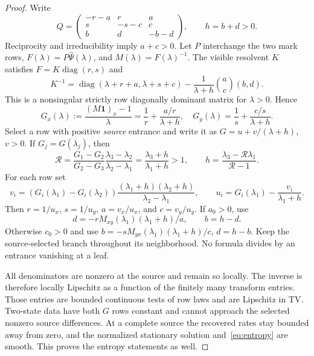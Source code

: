 \documentclass[aps,pre,onecolumn,11pt,longbibliography,notitlepage]{revtex4-2}
\newcommand{\1}{\mathbf 1}
\newcommand{\diag}{\operatorname{diag}}
\begin{document}
\begin{proof}
Write
\begin{equation}
 Q=\begin{pmatrix}-r-a&r&a\\s&-s-c&c\\b&d&-b-d\end{pmatrix},\qquad h=b+d>0.\label{eq:three}
\end{equation}
Reciprocity and irreducibility imply $a+c>0$. Let $P$ interchange the two mark rows, $F(\lambda)=P\widehat\Psi(\lambda)$, and $M(\lambda)=F(\lambda)^{-1}$. The visible resolvent $K$ satisfies $F=K\diag(r,s)$ and
\begin{equation}
 K^{-1}=\diag(\lambda+r+a,\lambda+s+c)
 -\frac1{\lambda+h}\binom a c(b,d).\label{eq:schur3}
\end{equation}
This is a nonsingular strictly row diagonally dominant matrix for $\lambda>0$. Hence
\begin{equation}
 G_x(\lambda):=\frac{(M\1)_x-1}{\lambda}=\frac1r+\frac{a/r}{\lambda+h},\quad
 G_y(\lambda)=\frac1s+\frac{c/s}{\lambda+h}.\label{eq:Grow}
\end{equation}
Select a row with positive \emph{source} entrance and write it as $G=u+v/(\lambda+h)$, $v>0$. If $G_j=G(\lambda_j)$, then
\begin{equation}
 \mathcal R=\frac{G_1-G_2}{G_2-G_3}\frac{\lambda_3-\lambda_2}{\lambda_2-\lambda_1}
 =\frac{\lambda_3+h}{\lambda_1+h}>1,\qquad
 h=\frac{\lambda_3-\mathcal R\lambda_1}{\mathcal R-1}.\label{eq:recoverh}
\end{equation}
For each row set
\begin{equation}
 v_i=(G_i(\lambda_1)-G_i(\lambda_2))
 \frac{(\lambda_1+h)(\lambda_2+h)}{\lambda_2-\lambda_1},\qquad
 u_i=G_i(\lambda_1)-\frac{v_i}{\lambda_1+h}.
\end{equation}
Then $r=1/u_x$, $s=1/u_y$, $a=v_x/u_x$, and $c=v_y/u_y$. If $a_0>0$, use
\begin{equation}
 d=-rM_{xy}(\lambda_1)(\lambda_1+h)/a,\qquad b=h-d.\label{eq:branch}
\end{equation}
Otherwise $c_0>0$ and use $b=-sM_{yx}(\lambda_1)(\lambda_1+h)/c$, $d=h-b$. Keep the source-selected branch throughout its neighborhood. No formula divides by an entrance vanishing at a leaf.

All denominators are nonzero at the source and remain so locally. The inverse is therefore locally Lipschitz as a function of the finitely many transform entries. Those entries are bounded continuous tests of row laws and are Lipschitz in TV. Two-state data have both $G$ rows constant and cannot approach the selected nonzero source differences. At a complete source the recovered rates stay bounded away from zero, and the normalized stationary solution and~\eqref{eq:entropy} are smooth. This proves the entropy statements as well.
\end{proof}
\end{document}
